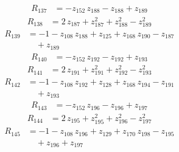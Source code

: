 \begin{equation*}\begin{aligned}
R_{137}&=-z_{152}\,z_{188} -z_{188} +z_{189}
\end{aligned}\end{equation*}
\begin{equation*}\begin{aligned}
R_{138}&=2\,z_{187} +z_{187}^{2} +z_{188}^{2} -z_{189}^{2}
\end{aligned}\end{equation*}
\begin{equation*}\begin{aligned}
R_{139}&=-1 -z_{108}\,z_{188} +z_{125} +z_{168}\,z_{190} -z_{187} \\
&\quad +z_{189}
\end{aligned}\end{equation*}
\begin{equation*}\begin{aligned}
R_{140}&=-z_{152}\,z_{192} -z_{192} +z_{193}
\end{aligned}\end{equation*}
\begin{equation*}\begin{aligned}
R_{141}&=2\,z_{191} +z_{191}^{2} +z_{192}^{2} -z_{193}^{2}
\end{aligned}\end{equation*}
\begin{equation*}\begin{aligned}
R_{142}&=-1 -z_{108}\,z_{192} +z_{128} +z_{168}\,z_{194} -z_{191} \\
&\quad +z_{193}
\end{aligned}\end{equation*}
\begin{equation*}\begin{aligned}
R_{143}&=-z_{152}\,z_{196} -z_{196} +z_{197}
\end{aligned}\end{equation*}
\begin{equation*}\begin{aligned}
R_{144}&=2\,z_{195} +z_{195}^{2} +z_{196}^{2} -z_{197}^{2}
\end{aligned}\end{equation*}
\begin{equation*}\begin{aligned}
R_{145}&=-1 -z_{108}\,z_{196} +z_{129} +z_{170}\,z_{198} -z_{195} \\
&\quad +z_{196} +z_{197}
\end{aligned}\end{equation*}

